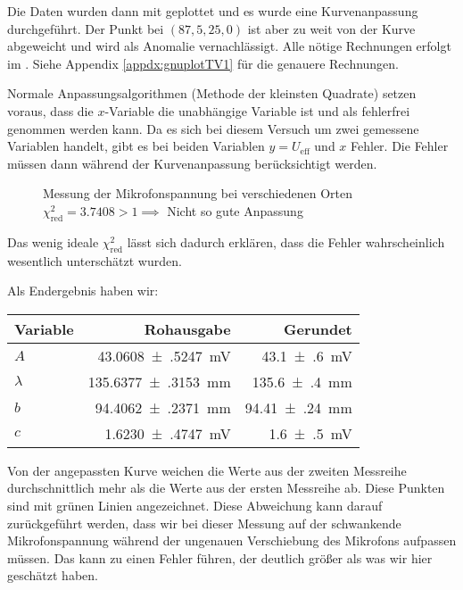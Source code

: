 		Die Daten wurden dann mit \gnuplot{} geplottet und es wurde eine Kurvenanpassung durchgeführt. Der Punkt bei $(87,5, 25,0)$ ist aber zu weit von der Kurve abgeweicht und wird als Anomalie vernachlässigt. Alle nötige Rechnungen erfolgt im \gnuplot{}. Siehe Appendix \ref{appdx:gnuplotTV1} für die genauere Rechnungen.

		Normale Anpassungsalgorithmen (Methode der kleinsten Quadrate) setzen voraus, dass die $x$-Variable die unabhängige Variable ist und als fehlerfrei genommen werden kann. Da es sich bei diesem Versuch um zwei gemessene Variablen handelt, gibt es bei beiden Variablen $y = U_\text{eff}$ und $x$ Fehler. Die Fehler müssen dann während der Kurvenanpassung berücksichtigt werden. 

		\begin{figure}[H]
			\centering
			
			\caption{\centering Messung der Mikrofonspannung bei verschiedenen Orten \captionbr $\chi^2_{\text{red}} = \num{3.7408} > 1 \implies$ Nicht so gute Anpassung}
			\label{fig:tvone-plot}
			\vspace{-1em}
		\end{figure}
		Das wenig ideale $\chi^2_{\text{red}}$ lässt sich dadurch erklären, dass die Fehler wahrscheinlich wesentlich unterschätzt wurden. 

		Als Endergebnis haben wir:
		\begin{center}
			\begin{tabular}{l r r}
				\toprule
				Variable & Rohausgabe & Gerundet \\
				\midrule
				$A$ & \SI{43.0608(5247)}{\milli\volt} & \SI{43.1(6)}{\milli\volt} \\
				$\lambda$ & \SI{135.6377(3153)}{\milli\meter} & \SI{135.6(4)}{\milli\meter} \\
				$b$ & \SI{94.4062(2371)}{\milli\meter} & \SI{94.41(24)}{\milli\meter} \\
				$c$ & \SI{1.6230(4747)}{\milli\volt}  & \SI{1.6(5)}{\milli\volt} \\
				\bottomrule
			\end{tabular}
		\end{center}

		Von der angepassten Kurve weichen die Werte aus der zweiten Messreihe durchschnittlich mehr als die Werte aus der ersten Messreihe ab. Diese Punkten sind mit grünen Linien angezeichnet. Diese Abweichung kann darauf zurückgeführt werden, dass wir bei dieser Messung auf der schwankende Mikrofonspannung während der ungenauen Verschiebung des Mikrofons aufpassen müssen. Das kann zu einen Fehler führen, der deutlich größer als was wir hier geschätzt haben. 

